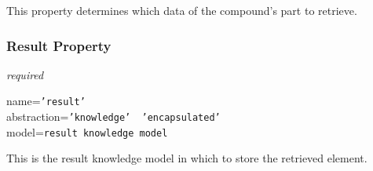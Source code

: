 This property determines which data of the compound's part to retrieve.

\subsubsection{Result Property}

\emph{required}

name=\texttt{'result'}\\
abstraction=\texttt{'knowledge' \vline\ 'encapsulated'}\\
model=\texttt{result knowledge model}

This is the result knowledge model in which to store the retrieved element.
